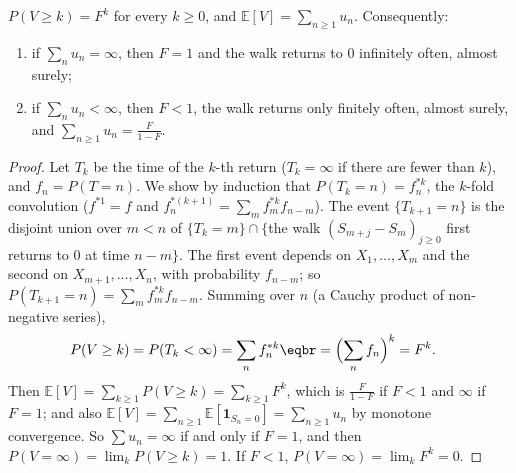 \begin{theorem}\label{thm:recurrence}
$P(V\ge k)=F^k$ for every $k\ge0$, and $\mathbb E[V]=\sum_{n\ge1}u_n$. Consequently:
\begin{enumerate}
\item[(a)] if $\sum_nu_n=\infty$, then $F=1$ and the walk returns to $0$ infinitely often, almost surely;
\item[(b)] if $\sum_nu_n<\infty$, then $F<1$, the walk returns only finitely often, almost surely, and $\sum_{n\ge1}u_n=\frac F{1-F}$.
\end{enumerate}
\end{theorem}
\begin{proof}
Let $T_k$ be the time of the $k$-th return ($T_k=\infty$ if there are fewer than $k$), and $f_n=P(T=n)$. We show by induction that $P(T_k=n)=f^{*k}_n$,
the $k$-fold convolution ($f^{*1}=f$ and $f^{*(k+1)}_n=\sum_mf^{*k}_mf_{n-m}$). The event $\{T_{k+1}=n\}$ is the disjoint union over $m<n$ of
$\{T_k=m\}\cap\{$the walk $(S_{m+j}-S_m)_{j\ge0}$ first returns to $0$ at time $n-m\}$. The first event depends on $X_1,\dots,X_m$ and the second on
$X_{m+1},\dots,X_n$, with probability $f_{n-m}$; so $P(T_{k+1}=n)=\sum_mf^{*k}_mf_{n-m}$. Summing over $n$ (a Cauchy product of non-negative series),
\[
\begin{aligned}P(V\ge k)&=P(T_k<\infty)=\sum_nf^{*k}_n\eqbr=\Bigl(\sum_nf_n\Bigr)^k=F^k.\end{aligned}
\]
Then $\mathbb E[V]=\sum_{k\ge1}P(V\ge k)=\sum_{k\ge1}F^k$, which is $\frac F{1-F}$ if $F<1$ and $\infty$ if $F=1$; and also $\mathbb E[V]=\sum_{n\ge1}\mathbb E[\mathbf 1_{S_n=0}]=\sum_{n\ge1}u_n$ by
monotone convergence. So $\sum u_n=\infty$ if and only if $F=1$, and then $P(V=\infty)=\lim_kP(V\ge k)=1$. If $F<1$, $P(V=\infty)=\lim_kF^k=0$.
\end{proof}

